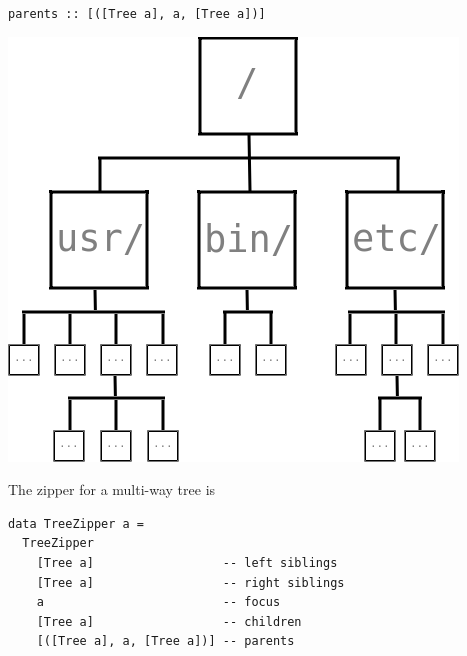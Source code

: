\begin{frame}[fragile]
\begin{block}{\lstinline{parents :: [([Tree a], a, [Tree a])]}}
\begin{center}
\includegraphics[width=0.60\textheight]{image/rosetree.png}
\end{center}
\end{block}
\end{frame}

\begin{frame}[fragile]
\begin{block}{The zipper for a multi-way tree is}
\begin{lstlisting}[style=haskell]
data TreeZipper a =
  TreeZipper
    [Tree a]                  -- left siblings
    [Tree a]                  -- right siblings
    a                         -- focus
    [Tree a]                  -- children
    [([Tree a], a, [Tree a])] -- parents
\end{lstlisting}
\end{block}
\end{frame}

